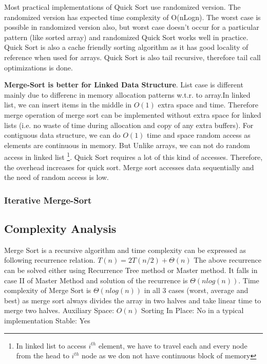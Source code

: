 Most practical implementations of Quick Sort use randomized version. The randomized version has expected time complexity of O(nLogn). The worst case is possible in randomized version also, but worst case doesn’t occur for a particular pattern (like sorted array) and randomized Quick Sort works well in practice.
Quick Sort is also a cache friendly sorting algorithm as it has good locality of reference when used for arrays.
Quick Sort is also tail recursive, therefore tail call optimizations is done.

\textbf{Merge-Sort is better for Linked Data Structure}.
List case is different mainly due to differenc in memory allocation patterns w.t.r. to array.In linked list, we can insert items in the middle in $O(1)$ extra space and time. Therefore merge operation of merge sort can be implemented without extra space for linked lists (i.e. no waste of time during allocation and copy of any extra buffers). 
For contiguous data structure, we can do $O(1)$ time and space random access as elements are continuous in memory. But  Unlike arrays, we can not do random access in linked list \footnote{In linked list to access $i^{th}$ element, we have to travel each and every node from the head to $i^{th}$ node as we don not have continuous block of memory}. Quick Sort requires a lot of this kind of accesses. Therefore, the overhead increases for quick sort. Merge sort accesses data sequentially and the need of random access is low.


\subsubsection{Iterative Merge-Sort}

\subsection{Complexity Analysis}

Merge Sort is a recursive algorithm and time complexity can be expressed as following recurrence relation.
$T(n) = 2T(n/2) + \Theta(n)$
The above recurrence can be solved either using Recurrence Tree method or Master method. It falls in case II of Master Method and solution of the recurrence is $\Theta(nlog(n))$.
Time complexity of Merge Sort is $\Theta(nlog(n))$ in all 3 cases (worst, average and best) as merge sort always divides the array in two halves and take linear time to merge two halves.
Auxiliary Space: $O(n)$
Sorting In Place: No in a typical implementation
Stable: Yes




